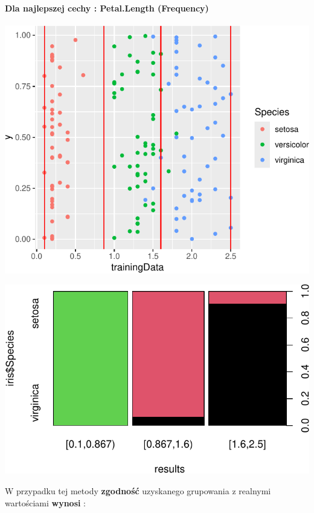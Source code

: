\documentclass[
  12pt,
]{article}
\begin{document}
\paragraph{Dla najlepszej cechy : Petal.Length
(Frequency)}\label{dla-najlepszej-cechy-petal.length-frequency}

\begin{center}\includegraphics{Sprawozdanie2_files/figure-latex/frequences_najl-1} \end{center}

\begin{center}\includegraphics{Sprawozdanie2_files/figure-latex/tabela_kondygnacji_1_najl-1} \end{center}

W przypadku tej metody \textbf{zgodność} uzyskanego grupowania z
realnymi wartościami \textbf{wynosi} :
\end{document}
